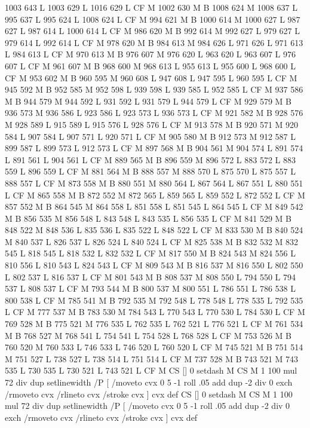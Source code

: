 {{{{{{{{{{{{{{{{{{{{{{{{1003 643 L
1003 629 L
1016 629 L
CF M
1002 630 M B
1008 624 M 1008 637 L
995 637 L
995 624 L
1008 624 L
CF M
994 621 M B
1000 614 M 1000 627 L
987 627 L
987 614 L
1000 614 L
CF M
986 620 M B
992 614 M 992 627 L
979 627 L
979 614 L
992 614 L
CF M
978 620 M B
984 613 M 984 626 L
971 626 L
971 613 L
984 613 L
CF M
970 613 M B
976 607 M 976 620 L
963 620 L
963 607 L
976 607 L
CF M
961 607 M B
968 600 M 968 613 L
955 613 L
955 600 L
968 600 L
CF M
953 602 M B
960 595 M 960 608 L
947 608 L
947 595 L
960 595 L
CF M
945 592 M B
952 585 M 952 598 L
939 598 L
939 585 L
952 585 L
CF M
937 586 M B
944 579 M 944 592 L
931 592 L
931 579 L
944 579 L
CF M
929 579 M B
936 573 M 936 586 L
923 586 L
923 573 L
936 573 L
CF M
921 582 M B
928 576 M 928 589 L
915 589 L
915 576 L
928 576 L
CF M
913 578 M B
920 571 M 920 584 L
907 584 L
907 571 L
920 571 L
CF M
905 580 M B
912 573 M 912 587 L
899 587 L
899 573 L
912 573 L
CF M
897 568 M B
904 561 M 904 574 L
891 574 L
891 561 L
904 561 L
CF M
889 565 M B
896 559 M 896 572 L
883 572 L
883 559 L
896 559 L
CF M
881 564 M B
888 557 M 888 570 L
875 570 L
875 557 L
888 557 L
CF M
873 558 M B
880 551 M 880 564 L
867 564 L
867 551 L
880 551 L
CF M
865 558 M B
872 552 M 872 565 L
859 565 L
859 552 L
872 552 L
CF M
857 552 M B
864 545 M 864 558 L
851 558 L
851 545 L
864 545 L
CF M
849 542 M B
856 535 M 856 548 L
843 548 L
843 535 L
856 535 L
CF M
841 529 M B
848 522 M 848 536 L
835 536 L
835 522 L
848 522 L
CF M
833 530 M B
840 524 M 840 537 L
826 537 L
826 524 L
840 524 L
CF M
825 538 M B
832 532 M 832 545 L
818 545 L
818 532 L
832 532 L
CF M
817 550 M B
824 543 M 824 556 L
810 556 L
810 543 L
824 543 L
CF M
809 543 M B
816 537 M 816 550 L
802 550 L
802 537 L
816 537 L
CF M
801 543 M B
808 537 M 808 550 L
794 550 L
794 537 L
808 537 L
CF M
793 544 M B
800 537 M 800 551 L
786 551 L
786 538 L
800 538 L
CF M
785 541 M B
792 535 M 792 548 L
778 548 L
778 535 L
792 535 L
CF M
777 537 M B
783 530 M 784 543 L
770 543 L
770 530 L
784 530 L
CF M
769 528 M B
775 521 M 776 535 L
762 535 L
762 521 L
776 521 L
CF M
761 534 M B
768 527 M 768 541 L
754 541 L
754 528 L
768 528 L
CF M
753 526 M B
760 520 M 760 533 L
746 533 L
746 520 L
760 520 L
CF M
745 521 M B
751 514 M 751 527 L
738 527 L
738 514 L
751 514 L
CF M
737 528 M B
743 521 M 743 535 L
730 535 L
730 521 L
743 521 L
CF M
CS [] 0 setdash M
CS M 1 100 mul 72 div dup setlinewidth
/P [ /moveto cvx 0 5 -1 roll .05 add dup -2 div 0 exch /rmoveto cvx /rlineto cvx /stroke cvx ] cvx def
CS [] 0 setdash M
CS M 1 100 mul 72 div dup setlinewidth
/P [ /moveto cvx 0 5 -1 roll .05 add dup -2 div 0 exch /rmoveto cvx /rlineto cvx /stroke cvx ] cvx def
}}}}}}}}}}}}}}}}}}}}}}}}
